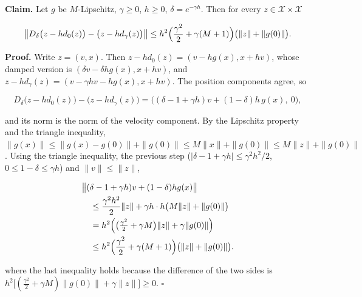 \documentclass[11pt,a4paper]{article}
\begin{document}
\textbf{Claim.} Let \(g\) be \(M\)-Lipschitz, \(\gamma\ge0\), \(h\ge0\), \(\delta=e^{-\gamma h}\). Then for every \(z\in\mathcal X\times\mathcal X\)


\[\bigl\|D_\delta\bigl(z-hd_0(z)\bigr)-\bigl(z-hd_\gamma(z)\bigr)\bigr\|\le h^2\Bigl(\frac{\gamma^2}2+\gamma(M+1)\Bigr)\bigl(\|z\|+\|g(0)\|\bigr).\]


\textbf{Proof.} Write \(z=(v,x)\). Then \(z-hd_0(z)=(v-hg(x),x+hv)\), whose damped version is \((\delta v-\delta hg(x),x+hv)\), and \(z-hd_\gamma(z)=(v-\gamma hv-hg(x),x+hv)\). The position components agree, so


\[D_\delta\bigl(z-hd_0(z)\bigr)-\bigl(z-hd_\gamma(z)\bigr)=\bigl((\delta-1+\gamma h)v+(1-\delta)h\,g(x),\ 0\bigr),\]


and its norm is the norm of the velocity component. By the Lipschitz property and the triangle inequality, \(\|g(x)\|\le\|g(x)-g(0)\|+\|g(0)\|\le M\|x\|+\|g(0)\|\le M\|z\|+\|g(0)\|\). Using the triangle inequality, the previous step (\(|\delta-1+\gamma h|\le\gamma^2h^2/2\), \(0\le1-\delta\le\gamma h\)) and \(\|v\|\le\|z\|\),


\[\begin{aligned}
&\bigl\|(\delta-1+\gamma h)v+(1-\delta)hg(x)\bigr\|\\
&\quad\le\frac{\gamma^2h^2}2\|z\|
  +\gamma h\cdot h\bigl(M\|z\|+\|g(0)\|\bigr)\\
&\quad=h^2\Bigl(\bigl(\tfrac{\gamma^2}2+\gamma M\bigr)\|z\|
  +\gamma\|g(0)\|\Bigr)\\
&\quad\le h^2\Bigl(\frac{\gamma^2}2+\gamma(M+1)\Bigr)
  \bigl(\|z\|+\|g(0)\|\bigr).
\end{aligned}\]


where the last inequality holds because the difference of the two sides is \(h^2\bigl[(\frac{\gamma^2}2+\gamma M)\|g(0)\|+\gamma\|z\|\bigr]\ge0\). \(\square\)
\end{document}
